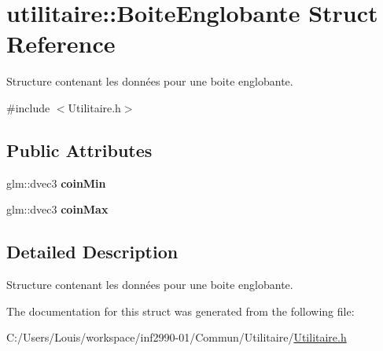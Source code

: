 \hypertarget{structutilitaire_1_1_boite_englobante}{}\section{utilitaire\+:\+:Boite\+Englobante Struct Reference}
\label{structutilitaire_1_1_boite_englobante}


Structure contenant les données pour une boite englobante.  




{\ttfamily \#include $<$Utilitaire.\+h$>$}

\subsection*{Public Attributes}
\begin{DoxyCompactItemize}
\item 
\hypertarget{structutilitaire_1_1_boite_englobante_a083f953a1ac5a830f70a2173a092e90a}{}glm\+::dvec3 {\bfseries coin\+Min}\label{structutilitaire_1_1_boite_englobante_a083f953a1ac5a830f70a2173a092e90a}

\item 
\hypertarget{structutilitaire_1_1_boite_englobante_af6f6d9ef23f6e5eb9f2f1ed6dd4d3e0e}{}glm\+::dvec3 {\bfseries coin\+Max}\label{structutilitaire_1_1_boite_englobante_af6f6d9ef23f6e5eb9f2f1ed6dd4d3e0e}

\end{DoxyCompactItemize}


\subsection{Detailed Description}
Structure contenant les données pour une boite englobante. 

The documentation for this struct was generated from the following file\+:\begin{DoxyCompactItemize}
\item 
C\+:/\+Users/\+Louis/workspace/inf2990-\/01/\+Commun/\+Utilitaire/\hyperlink{_utilitaire_8h}{Utilitaire.\+h}\end{DoxyCompactItemize}
